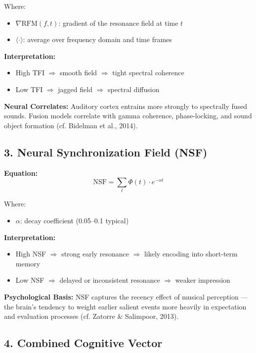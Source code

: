 \documentclass{article}
\begin{document}
Where:

\begin{itemize}
    \item $\nabla \text{RFM}(f, t)$: gradient of the resonance field at time $t$
    \item $\langle \cdot \rangle$: average over frequency domain and time frames
\end{itemize}

\textbf{Interpretation:}

\begin{itemize}
    \item High TFI $\Rightarrow$ smooth field $\Rightarrow$ tight spectral coherence
    \item Low TFI $\Rightarrow$ jagged field $\Rightarrow$ spectral diffusion
\end{itemize}

\textbf{Neural Correlates:} Auditory cortex entrains more strongly to spectrally fused sounds. Fusion models correlate with gamma coherence, phase-locking, and sound object formation (cf. Bidelman et al., 2014).

\subsection*{3. Neural Synchronization Field (NSF)}

\textbf{Equation:}
\[
\text{NSF} = \sum_t \Phi(t) \cdot e^{-\alpha t}
\]

Where:

\begin{itemize}
    \item $\alpha$: decay coefficient (0.05–0.1 typical)
\end{itemize}

\textbf{Interpretation:}

\begin{itemize}
    \item High NSF $\Rightarrow$ strong early resonance $\Rightarrow$ likely encoding into short-term memory
    \item Low NSF $\Rightarrow$ delayed or inconsistent resonance $\Rightarrow$ weaker impression
\end{itemize}

\textbf{Psychological Basis:} NSF captures the recency effect of musical perception — the brain’s tendency to weight earlier salient events more heavily in expectation and evaluation processes (cf. Zatorre \& Salimpoor, 2013).

\subsection*{4. Combined Cognitive Vector}
\end{document}
